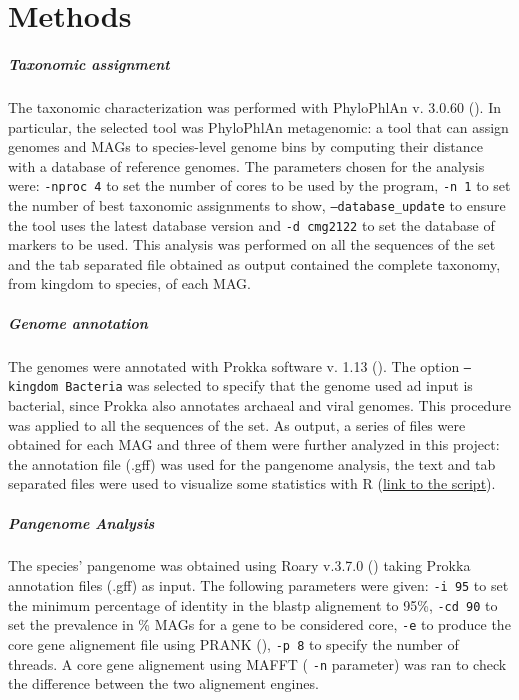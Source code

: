 \section*{Methods}




\nocite{Tange2011a}

\subparagraph*{Taxonomic assignment}

The taxonomic characterization was performed with PhyloPhlAn v. 3.0.60
(\cite{phylophlan}). In particular, the selected tool was PhyloPhlAn metagenomic:
a tool that can assign genomes and MAGs to species-level genome bins by
computing their distance with a database of reference genomes. The parameters
chosen for the analysis were: \texttt{-nproc 4} to set the number of cores to be
used by the program, \texttt{-n 1} to set the number of best taxonomic
assignments to show, \texttt{--database\_update} to ensure the tool uses the
latest database version and \texttt{-d cmg2122} to set the database of markers
to be used. This analysis was performed on all the sequences of the set and the
tab separated file obtained as output contained the complete taxonomy, from 
kingdom to species, of each MAG.

\subparagraph*{Genome annotation}

The genomes were annotated with Prokka software v. 1.13 (\cite{prokka}).
The option \texttt{--kingdom Bacteria} was selected to specify that the genome
used ad input is bacterial, since Prokka also annotates archaeal and viral
genomes. This procedure was applied to all the sequences of the set. As output,
a series of files were obtained for each MAG and three of them were further
analyzed in this project: the annotation file (.gff) was used for the pangenome
analysis, the text and tab separated files were used to visualize some
statistics with R (\href{https://github.com/enricofrigoli/cmg_project/blob/main/Rscript/CMG_Rscript.md}{link to the script}).



\subparagraph*{Pangenome Analysis}

The species' pangenome was obtained using Roary v.3.7.0 (\cite{Roary}) taking Prokka annotation files (.gff) as input. 
The following parameters were given: \texttt{-i 95} to set the minimum percentage of identity
in the blastp alignement to 95\%, \texttt{-cd 90} to set the prevalence in \% MAGs for a gene
to be considered core, \texttt{-e} to produce the core gene alignement file using PRANK (\cite{prank}), \texttt{-p 8} to
specify the number of threads. A core gene alignement using MAFFT ( \texttt{-n} parameter) was ran to check
the difference between the two alignement engines.

